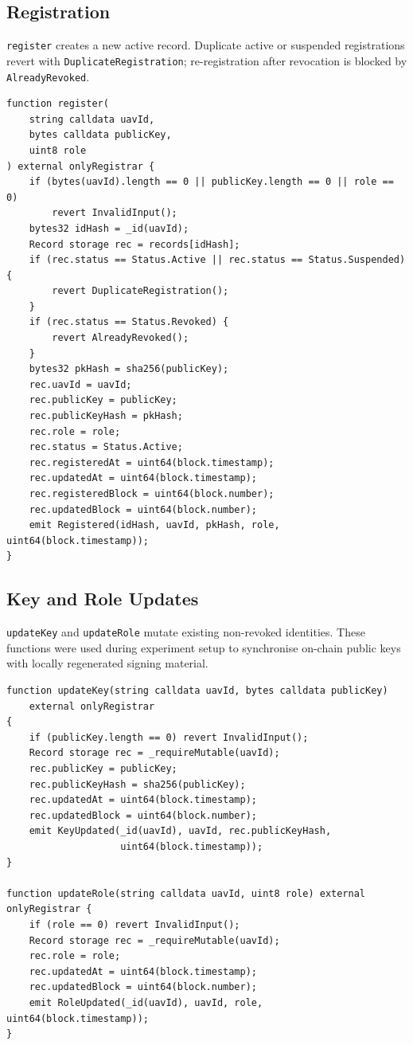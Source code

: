\subsection{Registration}
\label{app:contract-register}

\texttt{register} creates a new active record. Duplicate active or suspended registrations revert with \texttt{DuplicateRegistration}; re-registration after revocation is blocked by \texttt{AlreadyRevoked}.

\begin{lstlisting}[style=solidity,caption={Registration function (lines 80--105)},label=lst:registry-register]
function register(
    string calldata uavId,
    bytes calldata publicKey,
    uint8 role
) external onlyRegistrar {
    if (bytes(uavId).length == 0 || publicKey.length == 0 || role == 0)
        revert InvalidInput();
    bytes32 idHash = _id(uavId);
    Record storage rec = records[idHash];
    if (rec.status == Status.Active || rec.status == Status.Suspended) {
        revert DuplicateRegistration();
    }
    if (rec.status == Status.Revoked) {
        revert AlreadyRevoked();
    }
    bytes32 pkHash = sha256(publicKey);
    rec.uavId = uavId;
    rec.publicKey = publicKey;
    rec.publicKeyHash = pkHash;
    rec.role = role;
    rec.status = Status.Active;
    rec.registeredAt = uint64(block.timestamp);
    rec.updatedAt = uint64(block.timestamp);
    rec.registeredBlock = uint64(block.number);
    rec.updatedBlock = uint64(block.number);
    emit Registered(idHash, uavId, pkHash, role, uint64(block.timestamp));
}
\end{lstlisting}

\subsection{Key and Role Updates}
\label{app:contract-updates}

\texttt{updateKey} and \texttt{updateRole} mutate existing non-revoked identities. These functions were used during experiment setup to synchronise on-chain public keys with locally regenerated signing material.

\begin{lstlisting}[style=solidity,caption={Key and role update functions (lines 107--124)},label=lst:registry-updates]
function updateKey(string calldata uavId, bytes calldata publicKey)
    external onlyRegistrar
{
    if (publicKey.length == 0) revert InvalidInput();
    Record storage rec = _requireMutable(uavId);
    rec.publicKey = publicKey;
    rec.publicKeyHash = sha256(publicKey);
    rec.updatedAt = uint64(block.timestamp);
    rec.updatedBlock = uint64(block.number);
    emit KeyUpdated(_id(uavId), uavId, rec.publicKeyHash,
                    uint64(block.timestamp));
}

function updateRole(string calldata uavId, uint8 role) external onlyRegistrar {
    if (role == 0) revert InvalidInput();
    Record storage rec = _requireMutable(uavId);
    rec.role = role;
    rec.updatedAt = uint64(block.timestamp);
    rec.updatedBlock = uint64(block.number);
    emit RoleUpdated(_id(uavId), uavId, role, uint64(block.timestamp));
}
\end{lstlisting}

